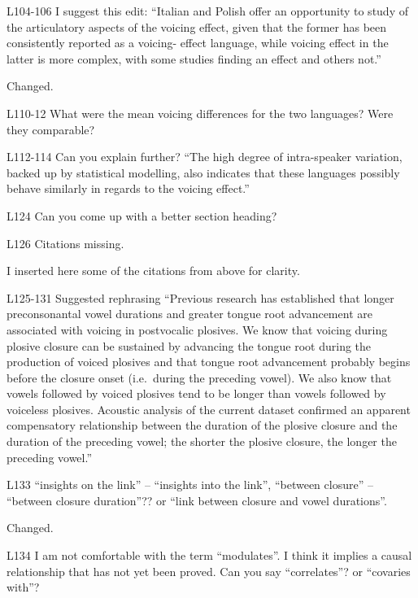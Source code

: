 \documentclass[]{article}
\begin{document}
L104-106 I suggest this edit: ``Italian and Polish offer an opportunity
to study of the articulatory aspects of the voicing effect, given that
the former has been consistently reported as a voicing- effect language,
while voicing effect in the latter is more complex, with some studies
finding an effect and others not.''

\color{plum}

Changed. \color{black}

L110-12 What were the mean voicing differences for the two languages?
Were they comparable?

L112-114 Can you explain further? ``The high degree of intra-speaker
variation, backed up by statistical modelling, also indicates that these
languages possibly behave similarly in regards to the voicing effect.''

L124 Can you come up with a better section heading?

L126 Citations missing.

\color{plum}

I inserted here some of the citations from above for clarity.
\color{black}

L125-131 Suggested rephrasing ``Previous research has established that
longer preconsonantal vowel durations and greater tongue root
advancement are associated with voicing in postvocalic plosives. We know
that voicing during plosive closure can be sustained by advancing the
tongue root during the production of voiced plosives and that tongue
root advancement probably begins before the closure onset (i.e.~during
the preceding vowel). We also know that vowels followed by voiced
plosives tend to be longer than vowels followed by voiceless plosives.
Acoustic analysis of the current dataset confirmed an apparent
compensatory relationship between the duration of the plosive closure
and the duration of the preceding vowel; the shorter the plosive
closure, the longer the preceding vowel.''

L133 ``insights on the link'' -- ``insights into the link'', ``between
closure'' -- ``between closure duration''?? or ``link between closure
and vowel durations''.

\color{plum}

Changed. \color{black}

L134 I am not comfortable with the term ``modulates''. I think it
implies a causal relationship that has not yet been proved. Can you say
``correlates''? or ``covaries with''?

\color{plum}
\end{document}
